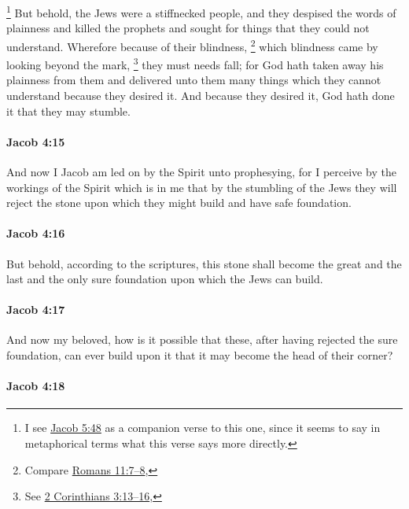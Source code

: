 				\footnote{%
					I see \hyperref[JACOB-5-48]{Jacob 5:48} as a companion verse to this one, since it seems to say in metaphorical terms what this verse says more directly.
					}%
			But behold, the Jews were a stiffnecked people,
			and they despised the words of plainness and killed the prophets
			and sought for things that they could not understand.
			Wherefore because of their blindness,%
				\footnote{%
					Compare \hyperref[ROMANS-11-7]{Romans 11:7--8}, 
					}
			which blindness came by looking beyond the mark,%
				\footnote{%
					See \hyperref[2CORINTHIANS-3-13]{2 Corinthians 3:13--16}, 
					}
			they must needs fall;
			for God hath taken away his plainness from them
			and delivered unto them many things which they cannot understand
			because they desired it.
			And because they desired it,
			God hath done it that they may stumble.

		\paragraph{Jacob 4:15} %
			\label{JACOB-4-15}

			And now I Jacob am led on by the Spirit unto prophesying,
			for I perceive by the workings of the Spirit which is in me
			that by the stumbling of the Jews they will reject the stone
			upon which they might build and have safe foundation.

		\paragraph{Jacob 4:16} %
			\label{JACOB-4-16}

			But behold, according to the scriptures,
			this stone shall become the great and the last and the only sure foundation
			upon which the Jews can build.

		\paragraph{Jacob 4:17} %
			\label{JACOB-4-17}

			And now my beloved, how is it possible
			that these, after having rejected the sure foundation, can ever build upon it
			that it may become the head of their corner?

		\paragraph{Jacob 4:18} %
			\label{JACOB-4-18}

